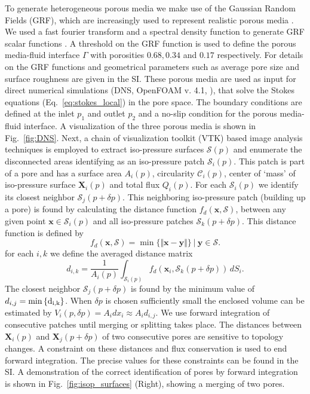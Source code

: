 \documentclass[draft]{agujournal2019}
\begin{document}
To generate heterogeneous porous media we make use of the Gaussian Random Fields (GRF), which are increasingly used to represent realistic porous media \cite{liu_advances_2019}. We used a fast fourier transform and a spectral density function to generate GRF scalar functions \cite{teubner_level_1991,hyman_heterogeneities_2012,siena_relationship_2014}. A threshold on the GRF function is used to define the porous media-fluid interface $\Gamma$ with porosities $0.68, 0.34$ and $0.17$ respectively. For details on the GRF functions and geometrical parameters such as average pore size and surface roughness are given in the SI. These porous media are used as input for direct numerical simulations (DNS, OpenFOAM v. 4.1, ), that solve the Stokes equations (Eq.~\ref{eq:stokes_local}) in the pore space. The boundary conditions are defined at the inlet $p_1$ and outlet $p_2$ and a no-slip condition for the porous media-fluid interface. A visualization of the three porous media is shown in Fig.~\ref{fig:DNS}. Next, a chain of visualization toolkit (VTK) based image analysis techniques \cite{schroeder_visualization_2006,hernderson_paraview_2007} is employed to extract iso-pressure surfaces $\mathcal{S}(p)$ and enumerate the disconnected areas identifying as an iso-pressure patch $\mathcal{S}_i(p)$. This patch is part of a pore and has a surface area $A_i(p)$, circularity $\mathcal{C}_i(p)$, center of `mass' of iso-pressure surface $\mathbf{X}_i(p)$ and total flux $Q_i(p)$. For each $\mathcal{S}_i(p)$ we identify its closest neighbor $\mathcal{S}_j(p+\delta p)$. This neighboring iso-pressure patch (building up a pore) is found by calculating the distance function $f_d(\mathbf{x},\mathcal{S})$, between any given point $\mathbf{x}\in \mathcal{S}_i(p)$ and all iso-pressure patches $\mathcal{S}_k(p+\delta p)$. This distance function is defined by
\begin{equation}
	f_d\left(\mathbf{x},\mathcal{S}\right) = \min \{\Vert\mathbf{x}-\mathbf{y}\Vert \} ~|~ \mathbf{y}\in \mathcal{S}.
\end{equation}
for each $i,k$ we define the averaged distance matrix 
\begin{equation}
	d_{i,k} = \frac{1}{A_i(p)}\int_{\mathcal{S}_i(p)} f_d(\mathbf{x}_i,\mathcal{S}_k(p+\delta p)) \,dS_i.
\end{equation}
The closest neighbor $\mathcal{S}_j(p+\delta p)$ is found by the minimum value of $d_{i,j} = \rm{min}\left\{ d_{i,k}\right\}$. When $\delta p$ is chosen sufficiently small the enclosed volume can be estimated by $V_i(p,\delta p)=A_id x_i \approx A_i d_{i,j}$. We use forward integration of consecutive patches until merging or splitting takes place. The distances between $\mathbf{X}_i(p)$ and $\mathbf{X}_j(p+\delta p)$ of two consecutive pores are sensitive to topology changes. A constraint on these distances and flux conservation is used to end forward integration. The precise values for these constraints can be found in the SI. A demonstration of the correct identification of pores by forward integration is shown in Fig.~\ref{fig:isop_surfaces} (Right), showing a merging of two pores. 
\end{document}
